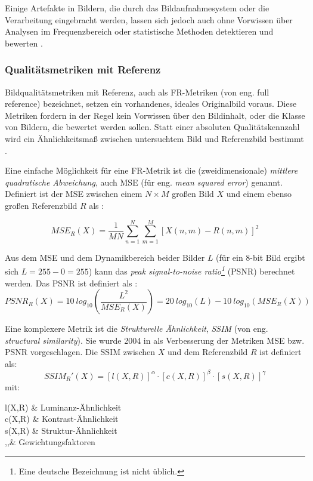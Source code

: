 Einige Artefakte in Bildern, die durch das Bildaufnahmesystem oder die Verarbeitung eingebracht werden, lassen sich jedoch auch ohne Vorwissen über Analysen im Frequenzbereich oder statistische Methoden detektieren und bewerten \cite[S.~86]{Wang2006}.

\subsubsection{Qualitätsmetriken mit Referenz}
Bildqualitätsmetriken mit Referenz, auch als FR-Metriken (von eng. full reference) bezeichnet, setzen ein vorhandenes, ideales Originalbild voraus. Diese Metriken fordern in der Regel kein Vorwissen über den Bildinhalt, oder die Klasse von Bildern, die bewertet werden sollen. Statt einer absoluten Qualitätskennzahl wird ein Ähnlichkeitsmaß zwischen untersuchtem Bild und Referenzbild bestimmt \cite[S.~43]{Wang2006}.

Eine einfache Möglichkeit für eine FR-Metrik ist die (zweidimensionale) \textit{mittlere quadratische Abweichung}, auch MSE (für eng. \textit{mean squared error}) genannt. Definiert ist der MSE zwischen einem $N \times M$ großen Bild $X$ und einem ebenso großen Referenzbild $R$ als \cite{Tan2013}:

\begin{equation}
	MSE_R(X)=\frac{1}{M N} \sum_{n=1}^{N} \sum_{m=1}^{M} [X(n,m) - R(n,m)]^2
\end{equation}

Aus dem MSE und dem Dynamikbereich beider Bilder $L$ (für ein 8-bit Bild ergibt sich $L=255-0=255$) kann das \textit{peak signal-to-noise ratio\footnote{Eine deutsche Bezeichnung ist nicht üblich.}} (PSNR) berechnet werden. Das PSNR ist definiert als \cite{Bondzulic2016}:
\begin{equation}
	PSNR_R(X)= 10\: log_{10}\left(\frac{L^2}{MSE_R(X)}\right) = 20\: log_{10}(L) - 10\: log_{10}(MSE_R(X))
\end{equation}

Eine komplexere Metrik ist die \textit{Strukturelle Ähnlichkeit}, \textit{SSIM} (von eng. \textit{structural similarity}). Sie wurde 2004 in \cite{Wang2004} als Verbesserung der Metriken MSE bzw. PSNR vorgeschlagen. Die SSIM zwischen $X$ und dem Referenzbild $R$ ist definiert als:
\begin{equation}
	SSIM_R'(X)=[l(X,R)]^\alpha\cdot[c(X,R)]^\beta\cdot[s(X,R)]^\gamma
\end{equation}
mit:
\begin{with}
	l(X,R) & Luminanz-Ähnlichkeit\\
	c(X,R) & Kontrast-Ähnlichkeit\\
	s(X,R) & Struktur-Ähnlichkeit\\
	\alpha,\beta,\gamma & Gewichtungsfaktoren \\
\end{with}

